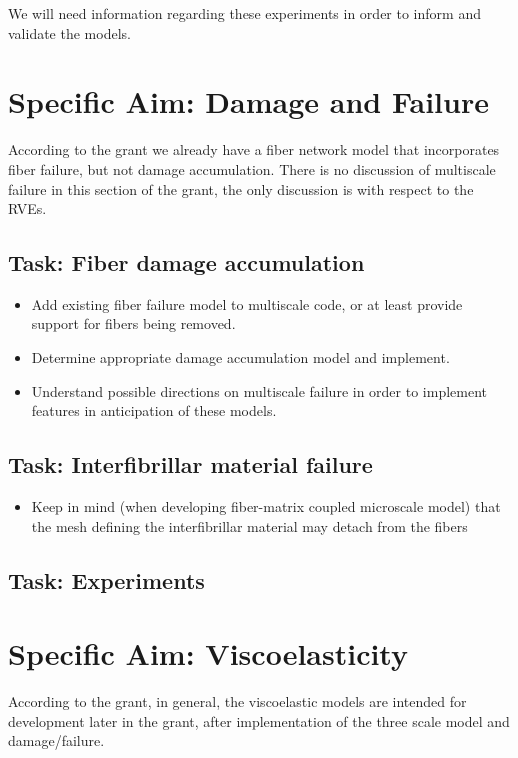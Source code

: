 \documentclass{article}
\begin{document}
We will need information regarding these experiments in order to inform and validate the models.

\section{Specific Aim: Damage and Failure}

According to the grant we already have a fiber network model that incorporates fiber failure, but not damage accumulation. There is no discussion of multiscale failure in this section of the grant, the only discussion is with respect to the RVEs.

\subsection{Task: Fiber damage accumulation}

\begin{itemize}
\item Add existing fiber failure model to multiscale code, or at least provide support for fibers being removed.
\item Determine appropriate damage accumulation model and implement.
\item Understand possible directions on multiscale failure in order to implement features in anticipation of these models.
\end{itemize}

\subsection{Task: Interfibrillar material failure}

\begin{itemize}
\item Keep in mind (when developing fiber-matrix coupled microscale model) that the mesh defining the interfibrillar material may detach from the fibers
\end{itemize}

\subsection{Task: Experiments}

\section{Specific Aim: Viscoelasticity}

According to the grant, in general, the viscoelastic models are intended for development later in the grant, after implementation of the three scale model and damage/failure.
\end{document}
